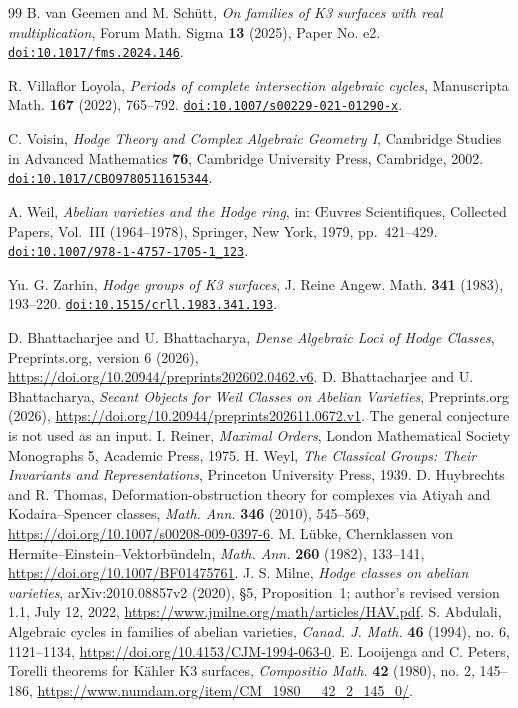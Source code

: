 \documentclass[11pt,reqno]{amsart}
\numberwithin{equation}{section}
\theoremstyle{plain}
\theoremstyle{definition}
\begin{document}
\begin{thebibliography}{99}
B. van Geemen and M. Sch\"utt,
\emph{On families of K3 surfaces with real multiplication},
Forum Math. Sigma \textbf{13} (2025), Paper No. e2.
\href{https://doi.org/10.1017/fms.2024.146}{\nolinkurl{doi:10.1017/fms.2024.146}}.

R. Villaflor Loyola,
\emph{Periods of complete intersection algebraic cycles},
Manuscripta Math. \textbf{167} (2022), 765--792.
\href{https://doi.org/10.1007/s00229-021-01290-x}{\nolinkurl{doi:10.1007/s00229-021-01290-x}}.

C. Voisin,
\emph{Hodge Theory and Complex Algebraic Geometry I},
Cambridge Studies in Advanced Mathematics \textbf{76},
Cambridge University Press, Cambridge, 2002.
\href{https://doi.org/10.1017/CBO9780511615344}{\nolinkurl{doi:10.1017/CBO9780511615344}}.

A. Weil,
\emph{Abelian varieties and the Hodge ring},
in: \OE uvres Scientifiques, Collected Papers, Vol.~III (1964--1978),
Springer, New York, 1979, pp.~421--429.
\href{https://doi.org/10.1007/978-1-4757-1705-1_123}{\nolinkurl{doi:10.1007/978-1-4757-1705-1_123}}.

Yu. G. Zarhin,
\emph{Hodge groups of K3 surfaces},
J. Reine Angew. Math. \textbf{341} (1983), 193--220.
\href{https://doi.org/10.1515/crll.1983.341.193}{\nolinkurl{doi:10.1515/crll.1983.341.193}}.


 D. Bhattacharjee and U. Bhattacharya, \emph{Dense Algebraic Loci of Hodge Classes}, Preprints.org, version 6 (2026), \url{https://doi.org/10.20944/preprints202602.0462.v6}.
 D. Bhattacharjee and U. Bhattacharya, \emph{Secant Objects for Weil Classes on Abelian Varieties}, Preprints.org (2026), \url{https://doi.org/10.20944/preprints202611.0672.v1}. The general conjecture is not used as an input.
 I. Reiner, \emph{Maximal Orders}, London Mathematical Society Monographs 5, Academic Press, 1975.
 H. Weyl, \emph{The Classical Groups: Their Invariants and Representations}, Princeton University Press, 1939.
 D. Huybrechts and R. Thomas, Deformation-obstruction theory for complexes via Atiyah and Kodaira--Spencer classes, \emph{Math. Ann.} \textbf{346} (2010), 545--569, \url{https://doi.org/10.1007/s00208-009-0397-6}.
 M. L\"ubke, Chernklassen von Hermite--Einstein--Vektorb\"undeln, \emph{Math. Ann.} \textbf{260} (1982), 133--141, \url{https://doi.org/10.1007/BF01475761}.
 J. S. Milne, \emph{Hodge classes on abelian varieties}, arXiv:2010.08857v2 (2020), \S5, Proposition~1; author's revised version 1.1, July 12, 2022, \url{https://www.jmilne.org/math/articles/HAV.pdf}.
 S. Abdulali, Algebraic cycles in families of abelian varieties, \emph{Canad. J. Math.} \textbf{46} (1994), no. 6, 1121--1134, \url{https://doi.org/10.4153/CJM-1994-063-0}.
 E. Looijenga and C. Peters, Torelli theorems for K\"ahler K3 surfaces, \emph{Compositio Math.} \textbf{42} (1980), no. 2, 145--186, \url{https://www.numdam.org/item/CM_1980__42_2_145_0/}.


\end{thebibliography}
\end{document}
